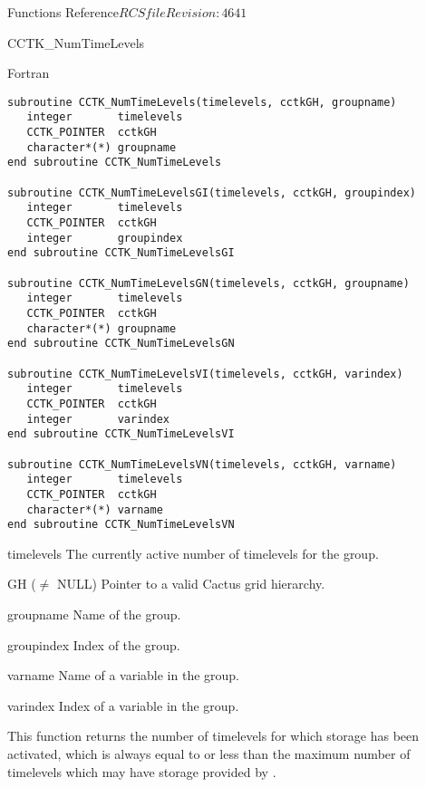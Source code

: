 \begin{cactuspart}{ Functions Reference}{$RCSfile$}{$Revision: 4641 $}
\begin{FunctionDescription}{CCTK\_NumTimeLevels}
\begin{SynopsisSection}
\begin{Synopsis}{Fortran}
\begin{verbatim}
subroutine CCTK_NumTimeLevels(timelevels, cctkGH, groupname)
   integer       timelevels
   CCTK_POINTER  cctkGH
   character*(*) groupname
end subroutine CCTK_NumTimeLevels

subroutine CCTK_NumTimeLevelsGI(timelevels, cctkGH, groupindex)
   integer       timelevels
   CCTK_POINTER  cctkGH
   integer       groupindex
end subroutine CCTK_NumTimeLevelsGI

subroutine CCTK_NumTimeLevelsGN(timelevels, cctkGH, groupname)
   integer       timelevels
   CCTK_POINTER  cctkGH
   character*(*) groupname
end subroutine CCTK_NumTimeLevelsGN

subroutine CCTK_NumTimeLevelsVI(timelevels, cctkGH, varindex)
   integer       timelevels
   CCTK_POINTER  cctkGH
   integer       varindex
end subroutine CCTK_NumTimeLevelsVI

subroutine CCTK_NumTimeLevelsVN(timelevels, cctkGH, varname)
   integer       timelevels
   CCTK_POINTER  cctkGH
   character*(*) varname
end subroutine CCTK_NumTimeLevelsVN
\end{verbatim}
\end{Synopsis}
\end{SynopsisSection}

\begin{ResultSection}
\begin{Result}{timelevels}
The currently active number of timelevels for the group.
\end{Result}
\end{ResultSection}

\begin{ParameterSection}
\begin{Parameter}{GH ($\ne$ NULL)}
Pointer to a valid Cactus grid hierarchy.
\end{Parameter}
\begin{Parameter}{groupname}
Name of the group.
\end{Parameter}
\begin{Parameter}{groupindex}
Index of the group.
\end{Parameter}
\begin{Parameter}{varname}
Name of a variable in the group.
\end{Parameter}
\begin{Parameter}{varindex}
Index of a variable in the group.
\end{Parameter}
\end{ParameterSection}

\begin{Discussion}
This function returns the number of timelevels for which storage has
been activated, which is always equal to or less than the maximum
number of timelevels which may have storage provided by
.


\end{Discussion}
\end{FunctionDescription}
\end{cactuspart}
